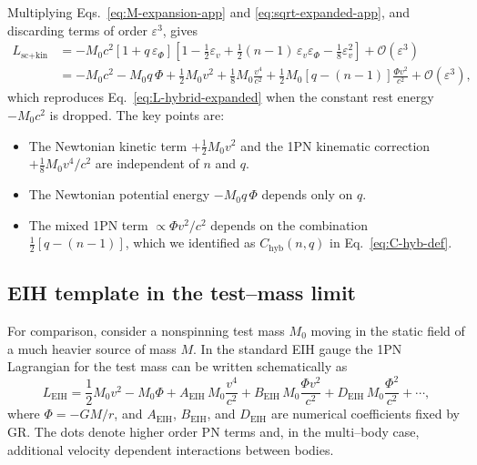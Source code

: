 \documentclass[11pt]{article}
\begin{document}
Multiplying Eqs.~\eqref{eq:M-expansion-app} and
\eqref{eq:sqrt-expanded-app}, and discarding terms of order
\(\varepsilon^3\), gives
\begin{align}
  L_{\text{sc+kin}}
  &= -M_0 c^2
     \left[
       1 + q\,\varepsilon_\Phi
     \right]
     \left[
       1 - \frac{1}{2}\varepsilon_v
         + \frac{1}{2}(n-1)\,\varepsilon_v \varepsilon_\Phi
         - \frac{1}{8}\varepsilon_v^2
     \right]
     + \mathcal{O}\!\left(\varepsilon^3\right) \nonumber \\
  &= -M_0 c^2
     - M_0 q\,\Phi
     + \frac{1}{2} M_0 v^2
     + \frac{1}{8} M_0 \frac{v^4}{c^2}
     + \frac{1}{2} M_0 \left[ q - (n-1) \right]
       \frac{\Phi v^2}{c^2}
     + \mathcal{O}\!\left(\varepsilon^3\right),
  \label{eq:L-sc-kin-1pn-app}
\end{align}
which reproduces Eq.~\eqref{eq:L-hybrid-expanded} when the constant rest
energy \(-M_0 c^2\) is dropped.  The key points are:
\begin{itemize}
  \item The Newtonian kinetic term \(+\tfrac{1}{2} M_0 v^2\) and the
        1PN kinematic correction \(+\tfrac{1}{8} M_0 v^4 / c^2\) are
        independent of \(n\) and \(q\).
  \item The Newtonian potential energy \(-M_0 q\,\Phi\) depends only on
        \(q\).
  \item The mixed 1PN term \(\propto \Phi v^2/c^2\) depends on the
        combination \(\tfrac{1}{2}[q - (n-1)]\), which we identified
        as \(C_{\text{hyb}}(n,q)\) in Eq.~\eqref{eq:C-hyb-def}.
\end{itemize}

\subsection{EIH template in the test--mass limit}
\label{app:1pn-eih-template}

For comparison, consider a nonspinning test mass \(M_0\) moving in the
static field of a much heavier source of mass \(M\).  In the standard EIH
gauge the 1PN Lagrangian for the test mass can be written schematically as
\begin{equation}
  L_{\text{EIH}}
  = \frac{1}{2} M_0 v^2
    - M_0 \Phi
    + A_{\text{EIH}}\,M_0 \frac{v^4}{c^2}
    + B_{\text{EIH}}\,M_0 \frac{\Phi v^2}{c^2}
    + D_{\text{EIH}}\,M_0 \frac{\Phi^2}{c^2}
    + \cdots,
  \label{eq:EIH-template-app}
\end{equation}
where \(\Phi = -G M / r\), and \(A_{\text{EIH}}\), \(B_{\text{EIH}}\),
and \(D_{\text{EIH}}\) are numerical coefficients fixed by GR.  The dots
denote higher order PN terms and, in the multi--body case, additional
velocity dependent interactions between bodies.
\end{document}
